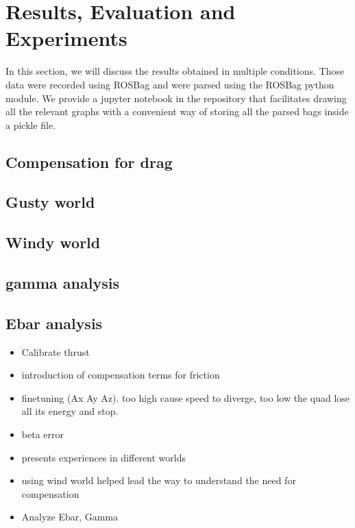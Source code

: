 \section{Results, Evaluation and Experiments}
In this section, we will discuss the results obtained in multiple conditions. Those data were recorded using ROSBag and were parsed using the ROSBag python module.
We provide a jupyter notebook in the repository that facilitates drawing all the relevant graphs with a convenient way of storing all the parsed bags inside a pickle file.

\subsection{Compensation for drag}

\subsection{Gusty world}

\subsection{Windy world}

\subsection{gamma analysis}

\subsection{Ebar analysis}



 \begin{itemize}
    \item Calibrate thrust
    \item  introduction of compensation terms for friction
    \item finetuning (Ax Ay Az). too high cause speed to diverge, too low the quad lose all its energy and stop. 
    \item beta error
    \item presents experiences in different worlds
    \item using wind world helped lead the way to understand the need for compensation
    \item Analyze Ebar, Gamma
 \end{itemize}
